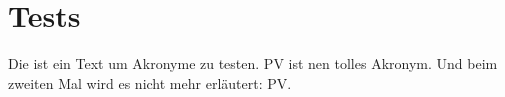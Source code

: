 
\section{Tests}

Die ist ein Text um Akronyme zu testen. \Ac{PV} ist nen tolles Akronym. Und beim zweiten Mal wird es nicht mehr erläutert: \ac{PV}.